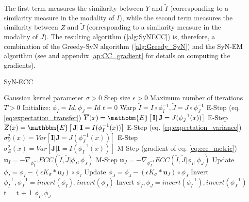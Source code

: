 The first term measures the similarity between $\overline{Y}$ and $\tilde{I}$ (corresponding to a similarity measure in the modality of $I$), while the second term measures the
similarity between $\overline{Z}$ and $\tilde{J}$ (corresponding to a similarity measure in the modality of $J$). The resulting algorithm (\ref{alg:SyNECC})
is, therefore, a combination of the Greedy-SyN algorithm (\ref{alg:Greedy_SyN}) and the SyN-EM algorithm (see \cite{Avants2008} and appendix \ref{ap:CC_gradient} for details on
computing the gradients).

\begin{algorithm}[h!]
\caption{SyN-ECC}\label{alg:SyNECC}
\begin{algorithmic}[1]
\REQUIRE Gaussian kernel parameter $\sigma>0$
\REQUIRE Step size $\epsilon>0$
\REQUIRE Maximum number of iterations $T>0$
\STATE Initialize: $\phi_{I} = Id, \phi_{J} = Id$
\STATE $t=0$
\REPEAT
    \STATE Warp $\tilde{I}  = I \circ \phi_{I}^{-1}, \tilde{J} = J \circ \phi_{J}^{-1}$
    \STATE E-Step (eq. \eqref{eq:expectation_transfer}) $\overline{Y}(x) = \mathbbm{E}\left[\left.\mathbf{I}\right| \mathbf{J}= J(\phi_{J}^{-1}(x))\right]$
    \STATE E-Step $\overline{Z}(x) = \mathbbm{E}\left[\left.\mathbf{J}\right| \mathbf{I}= I(\phi_{I}^{-1}(x))\right]$
    \STATE E-Step (eq. \eqref{eq:expectation_variance}) $\sigma^{2}_{Y}(x) = Var\left[\left.\mathbf{I}\right| \mathbf{J}= J(\phi_{J}^{-1}(x))\right]$
    \STATE E-Step $\sigma^{2}_{Z}(x) = Var\left[\left.\mathbf{J}\right| \mathbf{I}= I(\phi_{I}^{-1}(x))\right]$
    \STATE M-Step (gradient of eq. \eqref{eq:ecc_metric}) $\mathbf{u}_{I} = - \nabla_{\phi^{-1}_{I}} ECC(\tilde{I}, \tilde{J} | \phi_{I}, \phi_{J})$
    \STATE M-Step $\mathbf{u}_{J} = - \nabla_{\phi^{-1}_{J}} ECC(\tilde{I}, \tilde{J} | \phi_{I}, \phi_{J})$
    \STATE Update $\phi_{I} = \phi_{I} - \left(\epsilon K_{\sigma} \ast \mathbf{u}_{I} \right)\circ \phi_{I}$
    \STATE Update $\phi_{J} = \phi_{J} - \left(\epsilon K_{\sigma} \ast \mathbf{u}_{J} \right)\circ \phi_{J}$
    \STATE Invert $\phi_{I}^{-1}, \phi_{J}^{-1} = invert(\phi_{I}), invert(\phi_{J})$
    \STATE Invert $\phi_{I}, \phi_{J} = invert(\phi_{I}^{-1}), invert(\phi_{J}^{-1})$
    \STATE t = t + 1
\RETURN $\phi_{I}, \phi_{J}$
\end{algorithmic}
\end{algorithm}
